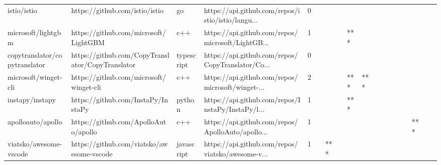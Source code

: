 \begin{tabular}{llllrlllllllllllll}
istio/istio                                        &                     https://github.com/istio/istio &                go &  https://api.github.com/repos/istio/istio/langu... &       0 &         &        &           &                &                 &        &           &           &          &          &       &              &          \\
microsoft/lightgbm                                 &              https://github.com/microsoft/LightGBM &               c++ &  https://api.github.com/repos/microsoft/LightGB... &       1 &         &        &           &            *** &                 &        &           &           &          &          &       &              &          \\
copytranslator/copytranslator                      &   https://github.com/CopyTranslator/CopyTranslator &        typescript &  https://api.github.com/repos/CopyTranslator/Co... &       0 &         &        &           &                &                 &        &           &           &          &          &       &              &          \\
microsoft/winget-cli                               &            https://github.com/microsoft/winget-cli &               c++ &  https://api.github.com/repos/microsoft/winget-... &       2 &         &        &           &            *** &             *** &        &           &           &          &          &       &              &          \\
instapy/instapy                                    &                 https://github.com/InstaPy/InstaPy &            python &  https://api.github.com/repos/InstaPy/InstaPy/l... &       1 &         &        &           &            *** &                 &        &           &           &          &          &       &              &          \\
apolloauto/apollo                                  &               https://github.com/ApolloAuto/apollo &               c++ &  https://api.github.com/repos/ApolloAuto/apollo... &       1 &         &        &           &                &                 &        &           &           &          &          &   *** &              &          \\
viatsko/awesome-vscode                             &          https://github.com/viatsko/awesome-vscode &        javascript &  https://api.github.com/repos/viatsko/awesome-v... &       1 &         &    *** &           &                &                 &        &           &           &          &          &       &              &          \\

\end{tabular}
